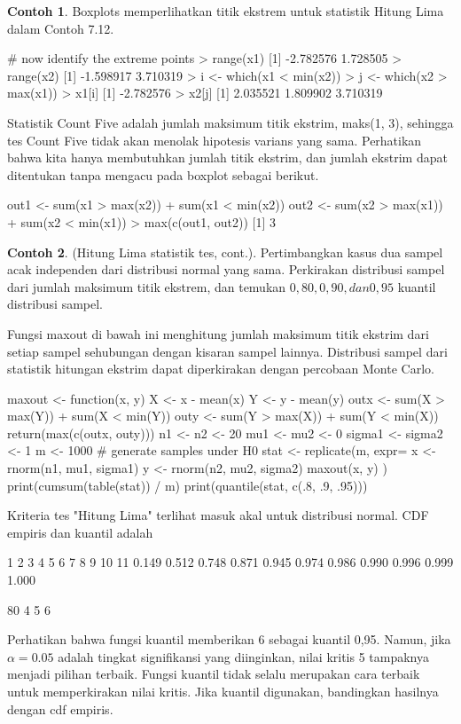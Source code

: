 \documentclass[a4paper,12pt]{article}
\theoremstyle{definition}
\newtheorem{example}{Contoh}[section]
\begin{document}
\begin{example}
    Boxplots memperlihatkan titik ekstrem untuk statistik Hitung Lima dalam Contoh 7.12.
\end{example}
\begin{spverbatim}
       # now identify the extreme points
       > range(x1)
       [1] -2.782576 1.728505
       > range(x2)
       [1] -1.598917 3.710319
       > i <- which(x1 < min(x2))
       > j <- which(x2 > max(x1))
       > x1[i]
       [1] -2.782576
       > x2[j]
       [1] 2.035521 1.809902 3.710319
\end{spverbatim}
Statistik Count Five adalah jumlah maksimum titik ekstrim, maks(1, 3), sehingga tes Count Five tidak akan menolak hipotesis varians yang sama. Perhatikan bahwa kita hanya membutuhkan jumlah titik ekstrim, dan jumlah ekstrim dapat ditentukan tanpa mengacu pada boxplot sebagai berikut.
\begin{spverbatim}
    out1 <- sum(x1 > max(x2)) + sum(x1 < min(x2))
    out2 <- sum(x2 > max(x1)) + sum(x2 < min(x1))
    > max(c(out1, out2))
    [1] 3
\end{spverbatim}
\begin{example}
    (Hitung Lima statistik tes, cont.). Pertimbangkan kasus dua sampel acak independen dari distribusi normal yang sama. Perkirakan distribusi sampel dari jumlah maksimum titik ekstrem, dan temukan
    $0,80, 0,90, dan 0,95$ kuantil distribusi sampel.
\end{example}
Fungsi maxout di bawah ini menghitung jumlah maksimum titik ekstrim dari setiap sampel sehubungan dengan kisaran sampel lainnya. Distribusi sampel dari statistik hitungan ekstrim dapat diperkirakan dengan percobaan Monte Carlo.
\begin{spverbatim}
    maxout <- function(x, y) {
           X <- x - mean(x)
           Y <- y - mean(y)
           outx <- sum(X > max(Y)) + sum(X < min(Y))
           outy <- sum(Y > max(X)) + sum(Y < min(X))
           return(max(c(outx, outy)))
     }
     n1 <- n2 <- 20
     mu1 <- mu2 <- 0
     sigma1 <- sigma2 <- 1
     m <- 1000
     # generate samples under H0
     stat <- replicate(m, expr={
          x <- rnorm(n1, mu1, sigma1)
          y <- rnorm(n2, mu2, sigma2)
          maxout(x, y)
          })
      print(cumsum(table(stat)) / m)
      print(quantile(stat, c(.8, .9, .95)))
\end{spverbatim}
Kriteria tes "Hitung Lima" terlihat masuk akal untuk distribusi normal. CDF empiris dan kuantil adalah
\begin{spverbatim}
   1     2     3    4      5     6     7     8    9     10    11
0.149 0.512 0.748 0.871 0.945 0.974 0.986 0.990 0.996 0.999 1.000

80%
 4   5   6
\end{spverbatim}
Perhatikan bahwa fungsi kuantil memberikan 6 sebagai kuantil 0,95. Namun, jika $\alpha=0.05$ adalah tingkat signifikansi yang diinginkan, nilai kritis 5 tampaknya menjadi pilihan terbaik. Fungsi kuantil tidak selalu merupakan cara terbaik untuk memperkirakan nilai kritis. Jika kuantil digunakan, bandingkan hasilnya dengan cdf empiris.
\end{document}
